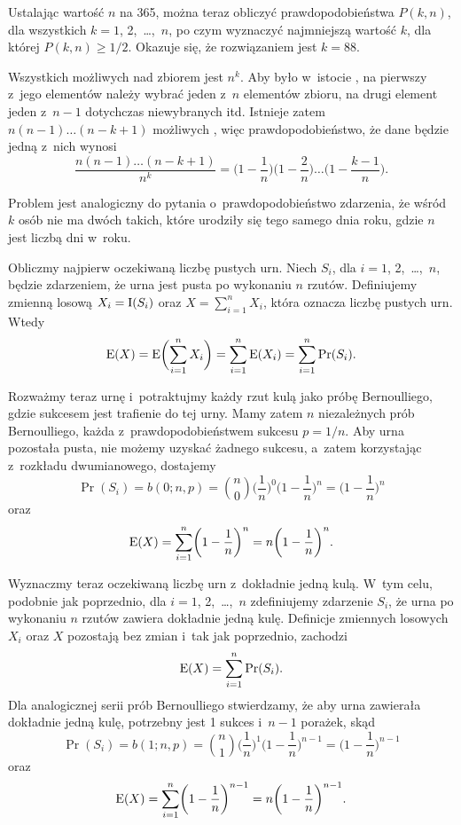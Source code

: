 Ustalając wartość $n$ na 365, można teraz obliczyć prawdopodobieństwa $P(k,n)$, dla wszystkich $k=1$, 2,~\dots,~$n$, po czym wyznaczyć najmniejszą wartość $k$, dla której $P(k,n)\ge1/2$. Okazuje się, że rozwiązaniem jest $k=88$.

\exercise %
Wszystkich możliwych  nad zbiorem  jest $n^k$. Aby  było w~istocie , na pierwszy z~jego elementów należy wybrać jeden z~$n$ elementów zbioru, na drugi element jeden z~$n-1$ dotychczas niewybranych itd. Istnieje zatem $n(n-1)\dots(n-k+1)$ możliwych , więc prawdopodobieństwo, że dane  będzie jedną z~nich wynosi
\[
	\frac{n(n-1)\dots(n-k+1)}{n^k} = \biggl(1-\frac{1}{n}\biggr)\biggl(1-\frac{2}{n}\biggr)\dots\biggl(1-\frac{k-1}{n}\biggr).
\]

Problem jest analogiczny do pytania o~prawdopodobieństwo zdarzenia, że wśród $k$ osób nie ma dwóch takich, które urodziły się tego samego dnia roku, gdzie $n$ jest liczbą dni w~roku.

\exercise %
Obliczmy najpierw oczekiwaną liczbę pustych urn. Niech $S_i$, dla $i=1$, 2,~\dots,~$n$, będzie zdarzeniem, że  urna jest pusta po wykonaniu $n$ rzutów. Definiujemy zmienną losową $X_i=\operatorname{I}(S_i)$ oraz $X=\sum_{i=1}^nX_i$, która oznacza liczbę pustych urn. Wtedy
\[
	\operatorname{E}(X) = \operatorname{E}\biggl(\sum_{i=1}^nX_i\biggr) = \sum_{i=1}^n\operatorname{E}(X_i) = \sum_{i=1}^n\Pr(S_i).
\]

Rozważmy teraz  urnę i~potraktujmy każdy rzut kulą jako próbę Bernoulliego, gdzie sukcesem jest trafienie do tej urny. Mamy zatem $n$ niezależnych prób Bernoulliego, każda z~prawdopodobieństwem sukcesu $p=1/n$. Aby  urna pozostała pusta, nie możemy uzyskać żadnego sukcesu, a~zatem korzystając z~rozkładu dwumianowego, dostajemy
\[
	\Pr(S_i) = b(0;n,p) = \binom{n}{0}\biggl(\frac{1}{n}\biggr)^0\biggl(1-\frac{1}{n}\biggr)^n = \biggl(1-\frac{1}{n}\biggr)^n
\]
oraz
\[
	\operatorname{E}(X) = \sum_{i=1}^n\biggl(1-\frac{1}{n}\biggr)^n = n\biggl(1-\frac{1}{n}\biggr)^n.
\]

Wyznaczmy teraz oczekiwaną liczbę urn z~dokładnie jedną kulą. W~tym celu, podobnie jak poprzednio, dla $i=1$, 2,~\dots,~$n$ zdefiniujemy zdarzenie $S_i$, że  urna po wykonaniu $n$ rzutów zawiera dokładnie jedną kulę. Definicje zmiennych losowych $X_i$ oraz $X$ pozostają bez zmian i~tak jak poprzednio, zachodzi
\[
	\operatorname{E}(X) = \sum_{i=1}^n\Pr(S_i).
\]
Dla analogicznej serii prób Bernoulliego stwierdzamy, że aby  urna zawierała dokładnie jedną kulę, potrzebny jest 1 sukces i~$n-1$ porażek, skąd
\[
	\Pr(S_i) = b(1;n,p) = \binom{n}{1}\biggl(\frac{1}{n}\biggr)^1\biggl(1-\frac{1}{n}\biggr)^{n-1} = \biggl(1-\frac{1}{n}\biggr)^{n-1}
\]
oraz
\[
	\operatorname{E}(X) = \sum_{i=1}^n\biggl(1-\frac{1}{n}\biggr)^{n-1} = n\biggl(1-\frac{1}{n}\biggr)^{n-1}.
\]

